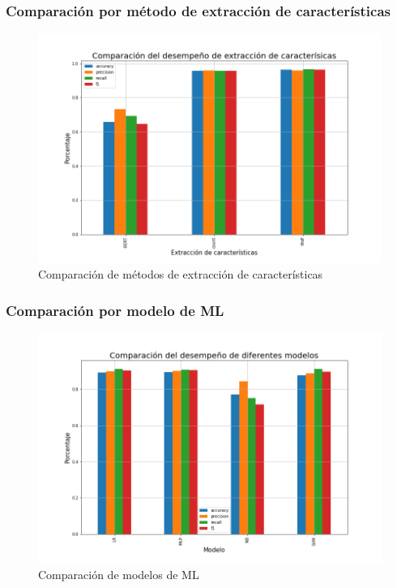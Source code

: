 \subsubsection{Comparación por método de extracción de características}
\begin{figure}
    \centering
    \includegraphics[width=\textwidth]{results/FakeNewsDetection/feature_extraction_comparison.png}
    \caption{Comparación de métodos de extracción de características}
    \label{fig:fake_news_feature_extraction}
\end{figure}

\subsubsection{Comparación por modelo de ML}
\begin{figure}
    \centering
    \includegraphics[width=\textwidth]{results/FakeNewsDetection/model_comparison.png}
    \caption{Comparación de modelos de ML}
    \label{fig:fake_news_models}
\end{figure}

